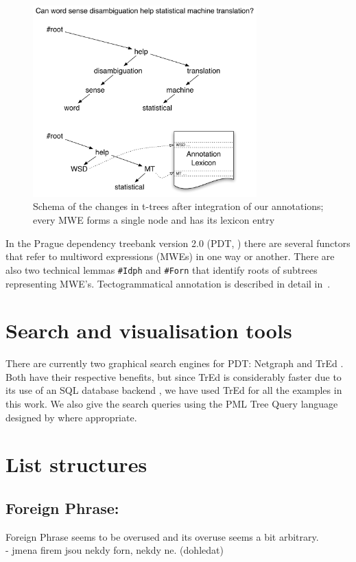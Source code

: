 \begin{figure}[htbp]
   \centering
   \includegraphics[width=3.4in]{images/stromecky.pdf}
   \caption{Schema of the changes in t-trees after integration of our annotations; every MWE forms a single node and has its lexicon entry}
   \label{fig:trees}
\end{figure}


In the Prague dependency treebank version 2.0 (PDT, ) there are several functors that refer to multiword expressions (MWEs) in one way or another. There are also two technical lemmas \texttt{\#Idph} and \texttt{\#Forn} that identify roots of subtrees representing MWE's. Tectogrammatical annotation is described in detail in~\citet{mikulova:2006}.


\section{Search and visualisation tools}

There are currently two graphical search engines for PDT: Netgraph \citep{mirovsky:2009} and TrEd \citep{pajas:tred}. Both have their respective benefits, but since TrEd is considerably faster due to its use of an SQL database backend \citep{pmltq}, we have used TrEd for all the examples in this work. We also give the search queries using the PML Tree Query language designed by \citet{pmltq} where appropriate.

\section{List structures}

\subsection{Foreign Phrase: }\label{PDT:Forn}
Foreign Phrase seems to be overused and its overuse seems a bit arbitrary. \\
- jmena firem jsou nekdy forn, nekdy ne. (dohledat)\\

